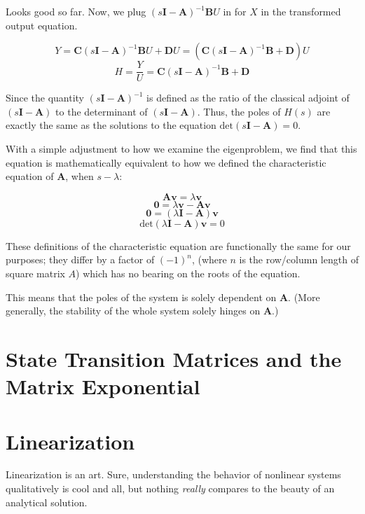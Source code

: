 \documentclass[
  letterpaper,
  DIV=11,
  numbers=noendperiod]{scrreprt}
\begin{document}
Looks good so far. Now, we plug
\((s\textbf{I}-\textbf{A})^{-1} \textbf{B} U\) in for \(X\) in the
transformed output equation.

\[Y = \textbf{C} (s\textbf{I}-\textbf{A})^{-1} \textbf{B} U + \textbf{D} U = (\textbf{C} (s\textbf{I}-\textbf{A})^{-1} \textbf{B} + \textbf{D}) U\]
\[H = \frac{Y}{U} = \textbf{C} (s\textbf{I}-\textbf{A})^{-1} \textbf{B} + \textbf{D}\]

Since the quantity \((s\textbf{I}-\textbf{A})^{-1}\) is defined as the
ratio of the classical adjoint of \((s\textbf{I}-\textbf{A})\) to the
determinant of \((s\textbf{I}-\textbf{A})\). Thus, the poles of \(H(s)\)
are exactly the same as the solutions to the equation
\(\text{det}(s\textbf{I}-\textbf{A}) = 0\).

With a simple adjustment to how we examine the eigenproblem, we find
that this equation is mathematically equivalent to how we defined the
characteristic equation of \(\textbf{A}\), when \(s-\lambda\):

\[\textbf{A} \boldsymbol{v} = \lambda \boldsymbol{v}\]
\[\boldsymbol{0} = \lambda \boldsymbol{v} - \textbf{A} \boldsymbol{v}\]
\[\boldsymbol{0} = (\lambda \textbf{I} - \textbf{A}) \boldsymbol{v}\]
\[\text{det}(\lambda \textbf{I} - \textbf{A}) \boldsymbol{v} = 0\]

These definitions of the characteristic equation are functionally the
same for our purposes; they differ by a factor of \((-1)^n\), (where
\(n\) is the row/column length of square matrix \(A\)) which has no
bearing on the roots of the equation.

This means that the poles of the system is solely dependent on
\(\textbf{A}\). (More generally, the stability of the whole system
solely hinges on \(\textbf{A}\).)

\hypertarget{state-transition-matrices-and-the-matrix-exponential}{%
\section{State Transition Matrices and the Matrix
Exponential}\label{state-transition-matrices-and-the-matrix-exponential}}

\hypertarget{linearization}{%
\section{Linearization}\label{linearization}}

Linearization is an art. Sure, understanding the behavior of nonlinear
systems qualitatively is cool and all, but nothing \emph{really}
compares to the beauty of an analytical solution.
\end{document}

